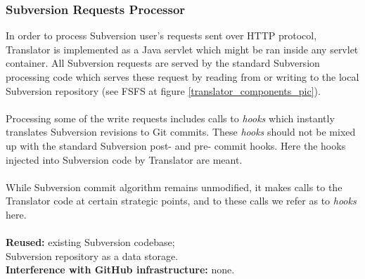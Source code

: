 \subsubsection{Subversion Requests Processor}
In order to process Subversion user's requests sent over HTTP protocol, Translator is implemented as a Java servlet which might be ran inside any servlet container. All Subversion requests are served by the standard Subversion processing code which serves 
these request by reading from or writing to the local Subversion repository (see FSFS at figure \ref{translator_components_pic}).
\\\\
Processing some of the write requests includes calls to \emph{hooks} which instantly translates Subversion revisions to Git commits.
These \emph{hooks} should not be mixed up with the standard Subversion post- and pre- commit hooks. 
Here the hooks injected into Subversion code by Translator are meant.\\\\
While Subversion commit algorithm remains unmodified, it makes calls to the Translator code at certain strategic points, 
and to these calls we refer as to \emph{hooks} here.
\\\\
\textbf{Reused:} existing Subversion codebase;\\Subversion repository as a data storage.\\
\textbf{Interference with GitHub infrastructure:} none. 

